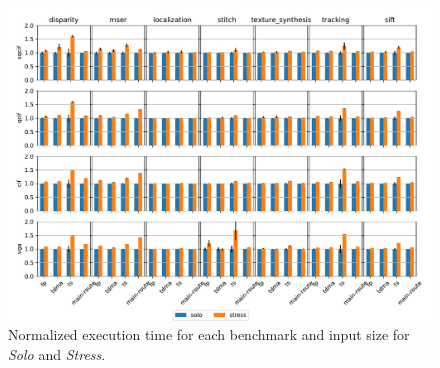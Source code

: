 \begin{figure}
    \centering
    \includegraphics[scale=0.54]{images/Execution_times.pdf}
    \caption{Normalized execution time for each benchmark and input size for \emph{Solo} and \emph{Stress}.}
    \label{fig:isolation_ratio}
\end{figure}
